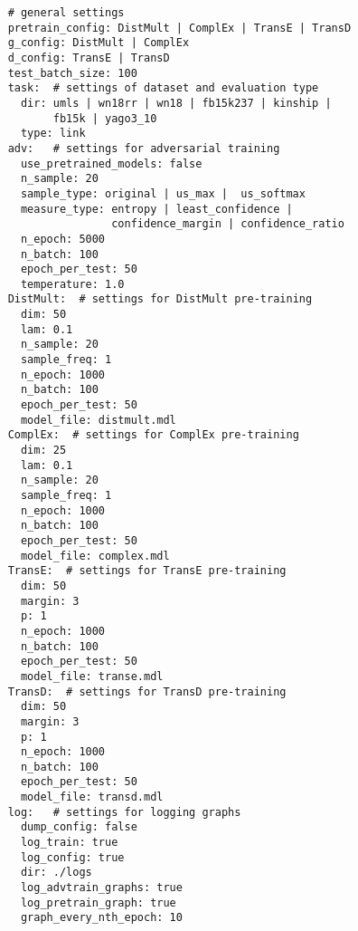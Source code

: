 \begin{verbatim}
    # general settings
    pretrain_config: DistMult | ComplEx | TransE | TransD
    g_config: DistMult | ComplEx
    d_config: TransE | TransD
    test_batch_size: 100 
    task:  # settings of dataset and evaluation type
      dir: umls | wn18rr | wn18 | fb15k237 | kinship | 
           fb15k | yago3_10
      type: link
    adv:   # settings for adversarial training
      use_pretrained_models: false
      n_sample: 20 
      sample_type: original | us_max |  us_softmax
      measure_type: entropy | least_confidence | 
                    confidence_margin | confidence_ratio  
      n_epoch: 5000
      n_batch: 100 
      epoch_per_test: 50
      temperature: 1.0
    DistMult:  # settings for DistMult pre-training
      dim: 50
      lam: 0.1
      n_sample: 20
      sample_freq: 1
      n_epoch: 1000
      n_batch: 100
      epoch_per_test: 50
      model_file: distmult.mdl
    ComplEx:  # settings for ComplEx pre-training
      dim: 25
      lam: 0.1
      n_sample: 20
      sample_freq: 1
      n_epoch: 1000 
      n_batch: 100 
      epoch_per_test: 50
      model_file: complex.mdl
    TransE:  # settings for TransE pre-training
      dim: 50
      margin: 3
      p: 1
      n_epoch: 1000 
      n_batch: 100 
      epoch_per_test: 50
      model_file: transe.mdl
    TransD:  # settings for TransD pre-training
      dim: 50
      margin: 3
      p: 1
      n_epoch: 1000 
      n_batch: 100
      epoch_per_test: 50
      model_file: transd.mdl
    log:   # settings for logging graphs
      dump_config: false
      log_train: true
      log_config: true
      dir: ./logs
      log_advtrain_graphs: true
      log_pretrain_graph: true
      graph_every_nth_epoch: 10
\end{verbatim}